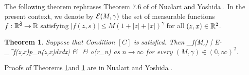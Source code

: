 \documentclass[a4paper,12pt]{article}
\newtheorem{theorem}{Theorem}[section]
\numberwithin{equation}{section}
\numberwithin{equation}{section}
\newcommand{\sred}{\color[rgb]{0.8,0,0}}
\newcommand{\sred}{\color{black}}%
\def\sfd{{\sf d}}
\begin{document}
The following theorem rephrases Theorem 7.6 of of Nualart and Yoshida \cite{nualart2019asymptotic}. 
{\sred 
In the present context, we denote by ${\cal E}(M,\gamma)$ 
the set of measurable functions 
$f:\bbR^{\check{\sfd}}\to\bbR$ satisfying 
$|f(z,s)|\leq M(1+|z|+|x|)^\gamma$ for all $(z,x)\in{\mathbb R}^2$. 
}
\begin{theorem}\label{202004011551}
Suppose that Condition $[C]$ is satisfied. Then 
\beas
\sup_{f\in\cale(M,\gamma)}
\bigg| E\big[f(Z_n,X_n)\big] 
-\int_{{\sred\bbR^{\check{\sfd}}}}f(z,x)p_n(z,x)dzdx\bigg|
&=& 
o(r_n)
\eeas
as $n\to\infty$ for every $(M,\gamma)\in(0,\infty)^2$. 
\end{theorem}
\halflineskip


Proofs of Theorems \ref{202004011551}and \ref{202004011551} are in 
Nualart and Yoshida \cite{nualart2019asymptotic}. 
\end{document}
